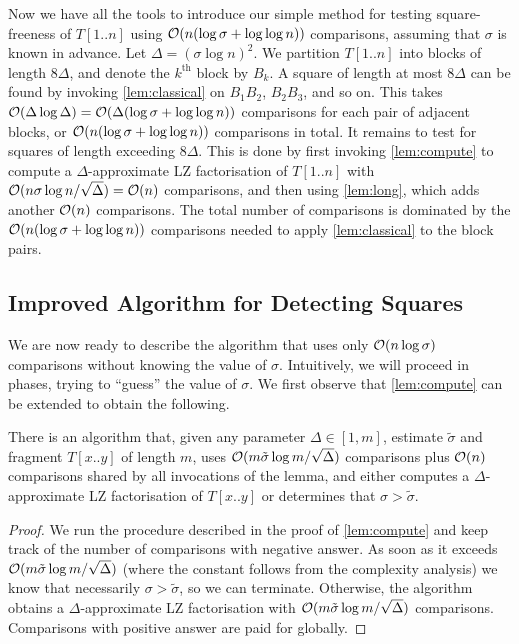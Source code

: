 Now we have all the tools to introduce our simple method for testing square-freeness of $T[1..n]$ using $\mathcal{O}(n (\log \sigma + \log \log n))$ comparisons, assuming that $\sigma$ is known in advance.
Let $\Delta = (\sigma\log n)^2$. We partition $T[1..n]$ into blocks of length $8\Delta$, and denote the $k^{\text{th}}$ block by $B_{k}$.
A square of length at most $8\Delta$ can be found by invoking \cref{lem:classical} on $B_{1}B_{2}$, $B_{2}B_{3}$, and so on. 
This takes $\mathcal{O}(\Delta \log \Delta) = \mathcal{O}(\Delta(\log \sigma + \log\log n))$ comparisons for each pair of adjacent blocks, or $\mathcal{O}(n(\log \sigma + \log\log n))$ comparisons in total. 
It remains to test for squares of length exceeding $8\Delta$.
This is done by
first invoking \cref{lem:compute} to compute a $\Delta$-approximate LZ factorisation of $T[1..n]$ with $\mathcal{O}(n\sigma\log n/\sqrt{\Delta}) = \mathcal{O}(n)$ comparisons, and then using \cref{lem:long}, which adds another $\mathcal{O}(n)$ comparisons. 
The total number of comparisons is dominated by the $\mathcal{O}(n(\log \sigma + \log \log n))$ comparisons needed to apply \cref{lem:classical} to the block pairs.

\subsection{Improved Algorithm for Detecting Squares}
\label{sec:improved}

We are now ready to describe the algorithm that uses only $\mathcal{O}(n\log \sigma)$ comparisons without knowing the 
value of $\sigma$. Intuitively, we will proceed in phases, trying to ``guess'' the value of $\sigma$. We first observe that
\cref{lem:compute} can be extended to obtain the following.

\begin{lemma}
\label{lem:compute2}
There is an algorithm that, given any parameter $\Delta \in [1,m]$, estimate $\tilde{\sigma}$ and fragment $T[x..y]$ of length $m$, uses
$\mathcal{O}(m\tilde{\sigma}\log m/\sqrt{\Delta})$ comparisons plus $\mathcal{O}(n)$ comparisons shared by all invocations of the lemma, and either computes a $\Delta$-approximate LZ factorisation of $T[x..y]$ or
determines that $\sigma>\tilde{\sigma}$.
\end{lemma}

\begin{proof}
We run the procedure described in the proof of \cref{lem:compute} and keep track of the number of comparisons
with negative answer. As soon as it exceeds $\mathcal{O}(m\tilde{\sigma}\log m/\sqrt{\Delta})$ (where the constant follows
from the complexity analysis) we know that necessarily $\sigma>\tilde{\sigma}$, so we can terminate. Otherwise, the algorithm
obtains a $\Delta$-approximate LZ factorisation with $\mathcal{O}(m\tilde{\sigma}\log m/\sqrt{\Delta})$ comparisons.
Comparisons with positive answer are paid for globally.
\end{proof}

